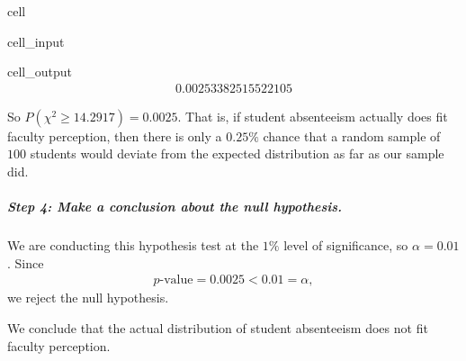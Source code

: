 \documentclass[letterpaper,10pt,english]{jupyterBook}
\begin{document}
\begin{sphinxuseclass}{cell}\begin{sphinxVerbatimInput}

\begin{sphinxuseclass}{cell_input}
\begin{sphinxVerbatim}[commandchars=\\\{\}]
\end{sphinxVerbatim}

\end{sphinxuseclass}\end{sphinxVerbatimInput}
\begin{sphinxVerbatimOutput}

\begin{sphinxuseclass}{cell_output}\begin{equation*}
\begin{split}0.00253382515522105\end{split}
\end{equation*}
\end{sphinxuseclass}\end{sphinxVerbatimOutput}

\end{sphinxuseclass}
\sphinxAtStartPar
So \(P(\chi^2 \geq 14.2917) = 0.0025\). That is, if student absenteeism actually does fit faculty perception, then there is only a \(0.25\%\) chance that a random sample of \(100\) students would deviate from the expected distribution as far as our sample did.


\subparagraph{Step 4: Make a conclusion about the null hypothesis.}
\label{\detokenize{Ch7 The Chi-Square Distribution/7.3 Goodness-of-Fit Test:step-4-make-a-conclusion-about-the-null-hypothesis}}
\sphinxAtStartPar
We are conducting this hypothesis test at the \(1\%\) level of significance, so \(\alpha = 0.01\). Since
\begin{equation*}
\begin{split} p\text{-value} = 0.0025 < 0.01 = \alpha, \end{split}
\end{equation*}
\sphinxAtStartPar
we reject the null hypothesis.

\sphinxAtStartPar
We conclude that the actual distribution of student absenteeism does not fit faculty perception.
\end{document}
